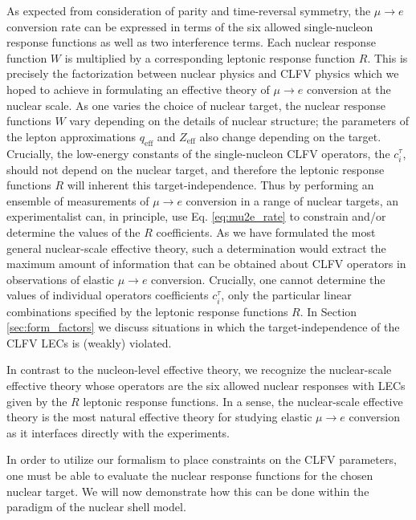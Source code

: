 \documentclass{book}[letterpaper,12pt]
\begin{document}
As expected from consideration of parity and time-reversal symmetry, the $\mu\rightarrow e$ conversion rate can be expressed in terms of the six allowed single-nucleon response functions as well as two interference terms. Each nuclear response function $W$ is multiplied by a corresponding leptonic response function $R$. This is precisely the factorization between nuclear physics and CLFV physics which we hoped to achieve in formulating an effective theory of $\mu\rightarrow e$ conversion at the nuclear scale. As one varies the choice of nuclear target, the nuclear response functions $W$ vary depending on the details of nuclear structure; the parameters of the lepton approximations $q_\mathrm{eff}$ and $Z_\mathrm{eff}$ also change depending on the target. Crucially, the low-energy constants of the single-nucleon CLFV operators, the $c_i^{\tau}$, should not depend on the nuclear target, and therefore the leptonic response functions $R$ will inherent this target-independence. Thus by performing an ensemble of measurements of $\mu\rightarrow e$ conversion in a range of nuclear targets, an experimentalist can, in principle, use Eq. \ref{eq:mu2e_rate} to constrain and/or determine the values of the $R$ coefficients. As we have formulated  the most general nuclear-scale effective theory, such a determination would extract the maximum amount of information that can be obtained about CLFV operators in observations of elastic $\mu\rightarrow e$ conversion. Crucially, one cannot determine the values of individual operators coefficients $c_i^{\tau}$, only the particular linear combinations specified by the leptonic response functions $R$. In Section \ref{sec:form_factors} we discuss situations in which the target-independence of the CLFV LECs is (weakly) violated.  

In contrast to the nucleon-level effective theory, we recognize the nuclear-scale effective theory whose operators are the six allowed nuclear responses with LECs given by the $R$ leptonic response functions. In a sense, the nuclear-scale effective theory is the most natural effective theory for studying elastic $\mu\rightarrow e$ conversion as it interfaces directly with the experiments.

In order to utilize our formalism to place constraints on the CLFV parameters, one must be able to evaluate the nuclear response functions for the chosen nuclear target. We will now demonstrate how this can be done within the paradigm of the nuclear shell model.
\end{document}
